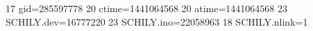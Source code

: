 17 gid=285597778
20 ctime=1441064568
20 atime=1441064568
23 SCHILY.dev=16777220
23 SCHILY.ino=22058963
18 SCHILY.nlink=1
